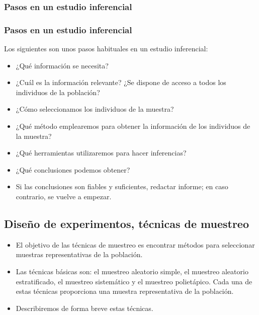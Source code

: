 \begin{frame}
 
  \subsubsection{Pasos en un estudio inferencial}
\frametitle{Pasos en un estudio inferencial}

Los siguientes son unos pasos habituales en un estudio inferencial:
  
\begin{itemize}
      \item ¿Qué información se necesita?
      \item ¿Cuál es la información relevante? ¿Se dispone de acceso
      a todos los individuos de la población?
      \item ¿Cómo seleccionamos los individuos de la muestra?
      \item ¿Qué método emplearemos para obtener la información de
      los individuos de la muestra?
      \item ¿Qué herramientas  utilizaremos para hacer inferencias?
      \item  ¿Qué conclusiones podemos obtener?
      \item   Si las conclusiones son fiables y suficientes,
      redactar informe; en caso contrario, se vuelve a empezar.
  \end{itemize}
\end{frame}

\begin{frame}
\subsection{Diseño de experimentos, técnicas de muestreo}
\begin{itemize}
\item El objetivo de las técnicas de muestreo es encontrar métodos para seleccionar muestras representativas de la población.
\item Las técnicas básicas son: el muestreo aleatorio simple, el muestreo aleatorio estratificado, el muestreo sistemático y el muestreo polietápico. 
Cada una de estas técnicas proporciona una muestra representativa de la población.
\item Describiremos de forma breve estas técnicas.
\end{itemize}
\end{frame}

